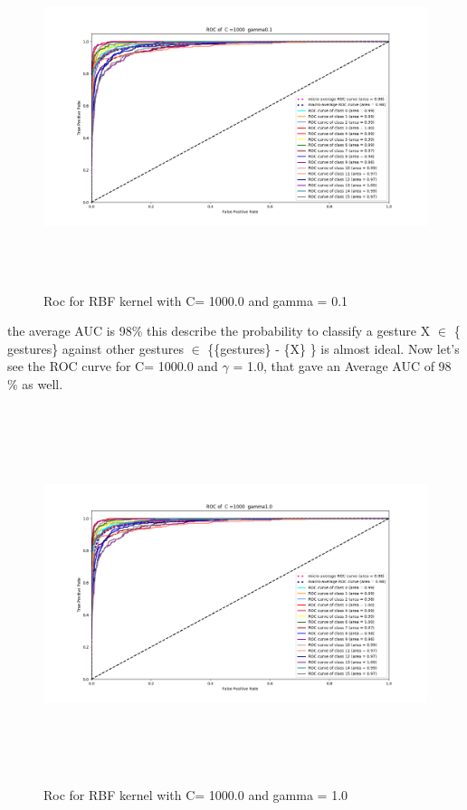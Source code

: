 \begin{figure}[H]
\centering
\includegraphics[width=16.5cm, height=10cm]{img/roc/RBF_C1000_gamma01.png}
\caption{Roc for RBF kernel with C= 1000.0 and gamma = 0.1}
\label{fig:rbf0}
\end{figure}
the average AUC is 98\% this describe the probability to classify a gesture X $\in$ \{ gestures\} against other gestures $\in$ \{\{gestures\} - \{X\} \} is almost ideal.
Now let's see the  ROC curve for C= 1000.0 and $\gamma$ = 1.0, that gave an Average AUC of 98 \% as well.
\begin{figure}[H]
\centering
\includegraphics[width=16.5cm, height=11cm]{img/roc/RBF_C1000_gamma10.png}
\caption{Roc for RBF kernel with C= 1000.0 and gamma = 1.0}
\label{fig:rbf1}
\end{figure}

